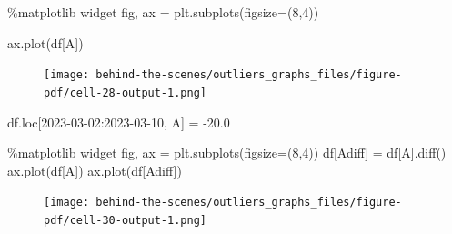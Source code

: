 \documentclass[
  letterpaper,
  DIV=11,
  numbers=noendperiod,
  oneside]{scrreprt}
\newenvironment{Shaded}{\begin{snugshade}}{\end{snugshade}}
\newcommand{\DecValTok}[1]{\textcolor[rgb]{0.68,0.00,0.00}{#1}}
\newcommand{\FloatTok}[1]{\textcolor[rgb]{0.68,0.00,0.00}{#1}}
\newcommand{\NormalTok}[1]{\textcolor[rgb]{0.00,0.23,0.31}{#1}}
\newcommand{\OperatorTok}[1]{\textcolor[rgb]{0.37,0.37,0.37}{#1}}
\newcommand{\StringTok}[1]{\textcolor[rgb]{0.13,0.47,0.30}{#1}}
\begin{document}
\begin{Shaded}
\begin{Highlighting}[]
\OperatorTok{\%}\NormalTok{matplotlib widget}
\NormalTok{fig, ax }\OperatorTok{=}\NormalTok{ plt.subplots(figsize}\OperatorTok{=}\NormalTok{(}\DecValTok{8}\NormalTok{,}\DecValTok{4}\NormalTok{))}

\NormalTok{ax.plot(df[}\StringTok{\textquotesingle{}A\textquotesingle{}}\NormalTok{])}
\end{Highlighting}
\end{Shaded}

\begin{figure}[H]

{\centering \texttt{[image: behind-the-scenes/outliers\_graphs\_files/figure-pdf/cell-28-output-1.png]}

}

\end{figure}

\begin{Shaded}
\begin{Highlighting}[]
\NormalTok{df.loc[}\StringTok{\textquotesingle{}2023{-}03{-}02\textquotesingle{}}\NormalTok{:}\StringTok{\textquotesingle{}2023{-}03{-}10\textquotesingle{}}\NormalTok{, }\StringTok{\textquotesingle{}A\textquotesingle{}}\NormalTok{] }\OperatorTok{=} \OperatorTok{{-}}\FloatTok{20.0}
\end{Highlighting}
\end{Shaded}

\begin{Shaded}
\begin{Highlighting}[]
\OperatorTok{\%}\NormalTok{matplotlib widget}
\NormalTok{fig, ax }\OperatorTok{=}\NormalTok{ plt.subplots(figsize}\OperatorTok{=}\NormalTok{(}\DecValTok{8}\NormalTok{,}\DecValTok{4}\NormalTok{))}
\NormalTok{df[}\StringTok{\textquotesingle{}Adiff\textquotesingle{}}\NormalTok{] }\OperatorTok{=}\NormalTok{ df[}\StringTok{\textquotesingle{}A\textquotesingle{}}\NormalTok{].diff()}
\NormalTok{ax.plot(df[}\StringTok{\textquotesingle{}A\textquotesingle{}}\NormalTok{])}
\NormalTok{ax.plot(df[}\StringTok{\textquotesingle{}Adiff\textquotesingle{}}\NormalTok{])}
\end{Highlighting}
\end{Shaded}

\begin{figure}[H]

{\centering \texttt{[image: behind-the-scenes/outliers\_graphs\_files/figure-pdf/cell-30-output-1.png]}

}

\end{figure}
\end{document}
